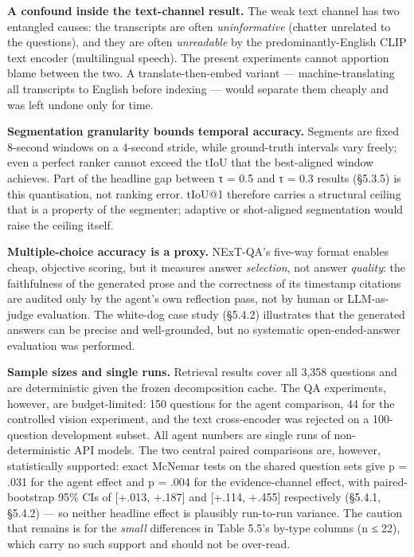 \textbf{A confound inside the text-channel result.} The weak text
channel has two entangled causes: the transcripts are often
\emph{uninformative} (chatter unrelated to the questions), and they are
often \emph{unreadable} by the predominantly-English CLIP text encoder
(multilingual speech). The present experiments cannot apportion blame
between the two. A translate-then-embed variant --- machine-translating
all transcripts to English before indexing --- would separate them
cheaply and was left undone only for time.

\textbf{Segmentation granularity bounds temporal accuracy.} Segments are
fixed 8-second windows on a 4-second stride, while ground-truth
intervals vary freely; even a perfect ranker cannot exceed the tIoU that
the best-aligned window achieves. Part of the headline gap between τ =
0.5 and τ = 0.3 results (§5.3.5) is this quantisation, not ranking
error. tIoU@1 therefore carries a structural ceiling that is a property
of the segmenter; adaptive or shot-aligned segmentation would raise the
ceiling itself.

\textbf{Multiple-choice accuracy is a proxy.} NExT-QA's five-way format
enables cheap, objective scoring, but it measures answer
\emph{selection}, not answer \emph{quality}: the faithfulness of the
generated prose and the correctness of its timestamp citations are
audited only by the agent's own reflection pass, not by human or
LLM-as-judge evaluation. The white-dog case study (§5.4.2) illustrates
that the generated answers can be precise and well-grounded, but no
systematic open-ended-answer evaluation was performed.

\textbf{Sample sizes and single runs.} Retrieval results cover all 3,358
questions and are deterministic given the frozen decomposition cache.
The QA experiments, however, are budget-limited: 150 questions for the
agent comparison, 44 for the controlled vision experiment, and the text
cross-encoder was rejected on a 100-question development subset. All
agent numbers are single runs of non-deterministic API models. The two
central paired comparisons are, however, statistically supported: exact
McNemar tests on the shared question sets give p = .031 for the agent
effect and p = .004 for the evidence-channel effect, with
paired-bootstrap 95\% CIs of {[}+.013, +.187{]} and {[}+.114, +.455{]}
respectively (§5.4.1, §5.4.2) --- so neither headline effect is
plausibly run-to-run variance. The caution that remains is for the
\emph{small} differences in Table 5.5's by-type columns (n ≤ 22), which
carry no such support and should not be over-read.

